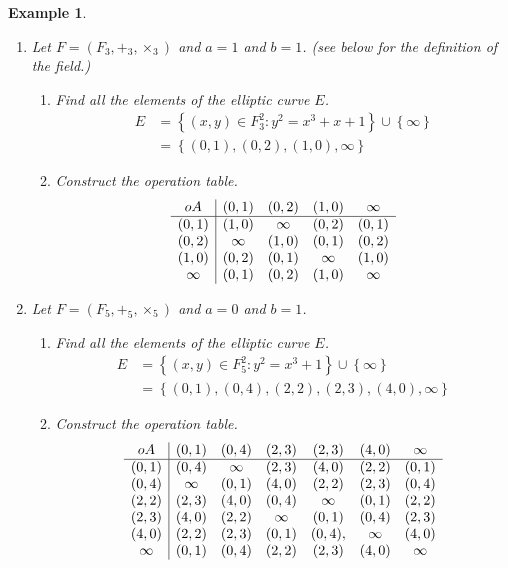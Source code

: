 \documentclass{article}%
\newtheorem{example}[theorem]{Example}
\begin{document}
\begin{example}
\ 

\begin{enumerate}
\item Let $F=(F_{3},+_{3},\times_{3})$ and $a=1$ and $b=1$. (see below for the
definition of the field.)

\begin{enumerate}
\item Find all the elements of the elliptic curve $E$.
\begin{align*}
E  &  =\left\{  \left(  x,y\right)  \in F_{3}^{2}:y^{2}=x^{3}+x+1\right\}
\cup\left\{  \infty\right\} \\
&  =\left\{  (0,1),(0,2),(1,0),\infty\right\}
\end{align*}


\item Construct the operation table.
\[
\begin{array}
[c]{c|cccc}%
oA & (0,1) & (0,2) & (1,0) & \infty\\
\hline
(0,1) & (1,0) & \infty & (0,2) & (0,1)\\
(0,2) & \infty & (1,0) & (0,1) & (0,2)\\
(1,0) & (0,2) & (0,1) & \infty & (1,0)\\
\infty & (0,1) & (0,2) & (1,0) & \infty
\end{array}
\]

\end{enumerate}

\item Let $F=\left(  F_{5},+_{5},\times_{5}\right)  $ and $a=0$ and $b=1$.

\begin{enumerate}

\item Find all the elements of the elliptic curve $E$.
\begin{align*}
E  &  =\left\{  \left(  x,y\right)  \in F_{5}^{2}:y^{2}=x^{3}+1\right\}
\cup\left\{  \infty\right\} \\
&  =\left\{  (0,1),(0,4),(2,2),(2,3),(4,0),\infty\right\}
\end{align*}

\item Construct the operation table.
\[
\begin{array}
[c]{c|cccccc}%
oA & (0,1) & (0,4) & (2,3) & (2,3) & (4,0) & \infty\\
\hline
(0,1) & (0,4) & \infty & (2,3) & (4,0) & (2,2) & (0,1)\\
(0,4) & \infty & (0,1) & (4,0) & (2,2) & (2,3) & (0,4)\\
(2,2) & (2,3) & (4,0) & (0,4) & \infty & (0,1) & (2,2)\\
(2,3) & (4,0) & (2,2) & \infty & (0,1) & (0,4) & (2,3)\\
(4,0) & (2,2) & (2,3) & (0,1) & (0,4), & \infty & (4,0)\\
\infty & (0,1) & (0,4) & (2,2) & (2,3) & (4,0) & \infty
\end{array}
\]
\end{enumerate}
\end{enumerate}
\end{example}
\end{document}
